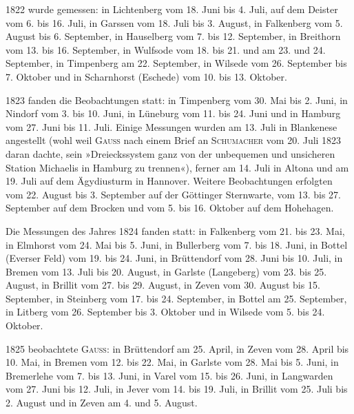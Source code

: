 \par\noindent\hspace*{\parindent}1822 wurde gemessen: in Lichtenberg vom 18. Juni bis 4. Juli, auf dem Deister vom 6. bis 16. Juli, in Garssen vom 18. Juli bis 3. August, in Falkenberg vom 5. August bis 6. September, in Hauselberg vom 7. bis 12. September, in Breithorn vom 13. bis 16. September, in Wulfsode vom 18. bis 21. und am 23. und 24. September, in Timpenberg am 22. September, in Wilsede vom 26. September bis 7. Oktober und in Scharnhorst (Eschede) vom 10. bis 13. Oktober.

\par\noindent\hspace*{\parindent}1823 fanden die Beobachtungen statt: in Timpenberg vom 30. Mai bis 2. Juni, in Nindorf vom 3. bis 10. Juni, in Lüneburg vom 11. bis 24. Juni und in Hamburg vom 27. Juni bis 11. Juli. Einige Messungen wurden am 13. Juli in Blankenese angestellt (wohl weil \textsc{Gauss} nach einem Brief an \textsc{Schumacher} vom 20. Juli 1823 daran dachte, sein »Dreieckssystem ganz von der unbequemen und unsicheren Station Michaelis in Hamburg zu trennen«), ferner am 14. Juli in Altona und am 19. Juli auf dem Ägydiusturm in Hannover. Weitere Beobachtungen erfolgten vom 22. August bis 3. September auf der Göttinger Sternwarte, vom 13. bis 27. September auf dem Brocken und vom 5. bis 16. Oktober auf dem Hohehagen.

\par\noindent\hspace*{\parindent}Die Messungen des Jahres 1824 fanden statt: in Falkenberg vom 21. bis 23. Mai, in Elmhorst vom 24. Mai bis 5. Juni, in Bullerberg vom 7. bis 18. Juni, in Bottel (Everser Feld) vom 19. bis 24. Juni, in Brüttendorf vom 28. Juni bis 10. Juli, in Bremen vom 13. Juli bis 20. August, in Garlste (Langeberg) vom 23. bis 25. August, in Brillit vom 27. bis 29. August, in Zeven vom 30. August bis 15. September, in Steinberg vom 17. bis 24. September, in Bottel am 25. September, in Litberg vom 26. September bis 3. Oktober und in Wilsede vom 5. bis 24. Oktober.

\par\noindent\hspace*{\parindent}1825 beobachtete \textsc{Gauss}: in Brüttendorf am 25. April, in Zeven vom 28. April bis 10. Mai, in Bremen vom 12. bis 22. Mai, in Garlste vom 28. Mai bis 5. Juni, in Bremerlehe vom 7. bis 13. Juni, in Varel vom 15. bis 26. Juni, in Langwarden vom 27. Juni bis 12. Juli, in Jever vom 14. bis 19. Juli, in Brillit vom 25. Juli bis 2. August und in Zeven am 4. und 5. August.

